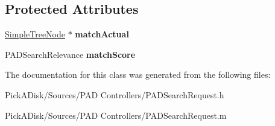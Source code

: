 \subsection*{Protected Attributes}
\begin{DoxyCompactItemize}
\item 
\hypertarget{interface_search_node_data_a8decabeb3b51dc5b40caced309be180c}{
\hyperlink{class_simple_tree_node}{SimpleTreeNode} $\ast$ {\bfseries matchActual}}
\label{interface_search_node_data_a8decabeb3b51dc5b40caced309be180c}

\item 
\hypertarget{interface_search_node_data_ad824f31ea6480c5b3e6bb8762854e3e5}{
PADSearchRelevance {\bfseries matchScore}}
\label{interface_search_node_data_ad824f31ea6480c5b3e6bb8762854e3e5}

\end{DoxyCompactItemize}


The documentation for this class was generated from the following files:\begin{DoxyCompactItemize}
\item 
PickADisk/Sources/PAD Controllers/PADSearchRequest.h\item 
PickADisk/Sources/PAD Controllers/PADSearchRequest.m\end{DoxyCompactItemize}
